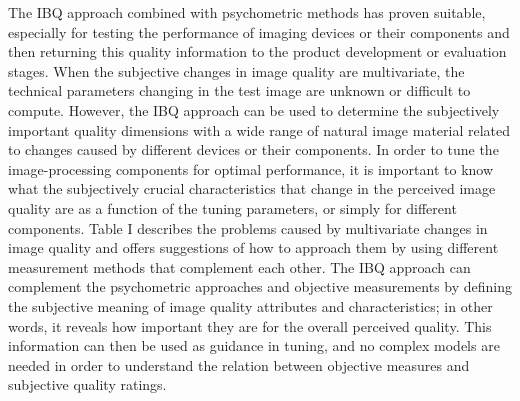 \documentclass[prodmode,acmtap]{acmlarge}
\begin{document}
The IBQ approach combined with psychometric methods has proven suitable,
especially for testing the performance of imaging devices or their
components and then returning this quality information to the product
development or evaluation stages. When the subjective changes in image
quality are multivariate, the technical parameters changing in the test
image are unknown or difficult to compute. However, the IBQ approach can be
used to determine the subjectively important quality dimensions with a wide
range of natural image material related to changes caused by different
devices or their components. In order to tune the image-processing
components for optimal performance, it is important to know what the
subjectively crucial characteristics that change in the perceived image
quality are as a function of the tuning parameters, or simply for different
components. Table I describes the problems caused by multivariate changes in
image quality and offers suggestions of how to approach them by using
different measurement methods that complement each other. The IBQ approach
can complement the psychometric approaches and objective measurements by
defining the subjective meaning of image quality attributes and
characteristics; in other words, it reveals how important they are for the
overall perceived quality. This information can then be used as guidance in
tuning, and no complex models are needed in order to understand the relation
between objective measures and subjective quality ratings.
\end{document}
